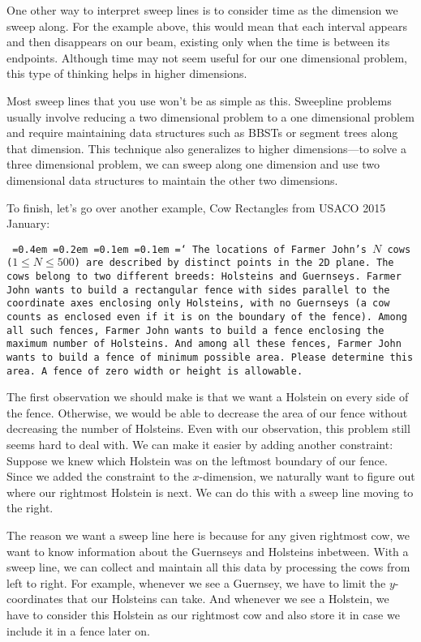 One other way to interpret sweep lines is to consider time as the dimension we sweep along. For the example above, this would mean that each interval appears and then disappears on our beam, existing only when the time is between its endpoints. Although time may not seem useful for our one dimensional problem, this type of thinking helps in higher dimensions. 

Most sweep lines that you use won't be as simple as this. Sweepline problems usually involve reducing a two dimensional problem to a one dimensional problem and require maintaining data structures such as BBSTs or segment trees along that dimension. This technique also generalizes to higher dimensions---to solve a three dimensional problem, we can sweep along one dimension and use two dimensional data structures to maintain the other two dimensions.

To finish, let's go over another example, Cow Rectangles from USACO 2015 January:

\texttt{
\font=0.4em%
\font=0.2em%
\font=0.1em%
\font=0.1em%
\hyphenchar\font=`\-%
The locations of Farmer John's $N$ cows ($1 \le N \le 500$) are described by distinct points in the 2D plane. The cows belong to two different breeds: Holsteins and Guernseys. Farmer John wants to build a rectangular fence with sides parallel to the coordinate axes enclosing only Holsteins, with no Guernseys (a cow counts as enclosed even if it is on the boundary of the fence). Among all such fences, Farmer John wants to build a fence enclosing the maximum number of Holsteins. And among all these fences, Farmer John wants to build a fence of minimum possible area. Please determine this area. A fence of zero width or height is allowable.}

The first observation we should make is that we want a Holstein on every side of the fence. Otherwise, we would be able to decrease the area of our fence without decreasing the number of Holsteins. Even with our observation, this problem still seems hard to deal with. We can make it easier by adding another constraint: Suppose we knew which Holstein was on the leftmost boundary of our fence. Since we added the constraint to the $x$-dimension, we naturally want to figure out where our rightmost Holstein is next. We can do this with a sweep line moving to the right.

The reason we want a sweep line here is because for any given rightmost cow, we want to know information about the Guernseys and Holsteins inbetween. With a sweep line, we can collect and maintain all this data by processing the cows from left to right. For example, whenever we see a Guernsey, we have to limit the $y$-coordinates that our Holsteins can take. And whenever we see a Holstein, we have to consider this Holstein as our rightmost cow and also store it in case we include it in a fence later on.

